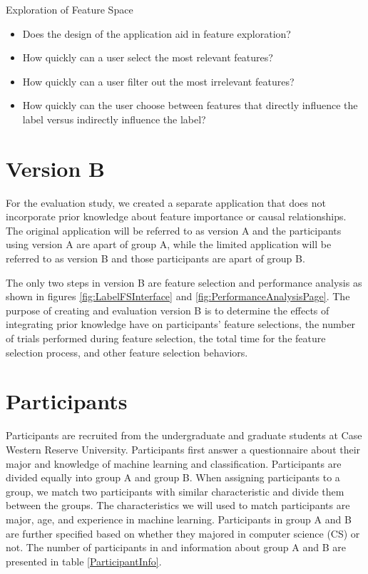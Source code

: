 Exploration of Feature Space
\begin{itemize}
\item{Does the design of the application aid in feature exploration?}
\item{How quickly can a user select the most relevant features?}
\item{How quickly can a user filter out the most irrelevant features?}
\item{How quickly can the user choose between features that directly influence the label versus indirectly influence the label?}
\end{itemize}

\section{ Version B }
For the evaluation study, we created a separate application that does not incorporate prior knowledge about feature importance or causal relationships. The original application will be referred to as version A and the participants using version A are apart of group A, while the limited application will be referred to as version B and those participants are apart of group B.

The only two steps in version B are feature selection and performance analysis as shown in figures \ref{fig:LabelFSInterface} and \ref{fig:PerformanceAnalysisPage}. The purpose of creating and evaluation version B is to determine the effects of integrating prior knowledge have on participants' feature selections, the number of trials performed during feature selection, the total time for the feature selection process, and other feature selection behaviors.

\section{ Participants }
Participants are recruited from the undergraduate and graduate students at Case Western Reserve University. Participants first answer a questionnaire about their major and knowledge of machine learning and classification. Participants are divided equally into group A and group B. When assigning participants to a group, we match two participants with similar characteristic and divide them between the groups. The characteristics we will used to match participants are major, age, and experience in machine learning. Participants in group A and B are further specified based on whether they majored in computer science (CS) or not. The number of participants in and information about group A and B are presented in table \ref{ParticipantInfo}.


